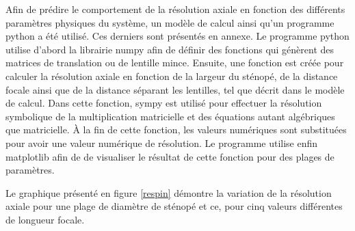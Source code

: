 \documentclass[11pt,letterpaper]{article}
\begin{document}
Afin de prédire le comportement de la résolution axiale en fonction des différents paramètres physiques du système, un modèle de calcul ainsi qu'un programme python a été utilisé. Ces derniers sont présentés en annexe. Le programme python utilise d'abord la librairie numpy afin de définir des fonctions qui génèrent des matrices de translation ou de lentille mince. Ensuite, une fonction est créée pour calculer la résolution axiale en fonction de la largeur du sténopé, de la distance focale ainsi que de la distance séparant les lentilles, tel que décrit dans le modèle de calcul. Dans cette fonction, sympy est utilisé pour effectuer la résolution symbolique de la multiplication matricielle et des équations autant algébriques que matricielle. À la fin de cette fonction, les valeurs numériques sont substituées pour avoir une valeur numérique de résolution. Le programme utilise enfin matplotlib afin de de visualiser le résultat de cette fonction pour des plages de paramètres.

Le graphique présenté en figure \ref{respin} démontre la variation de la résolution axiale pour une plage de diamètre de sténopé et ce, pour cinq valeurs différentes de longueur focale.
\end{document}
